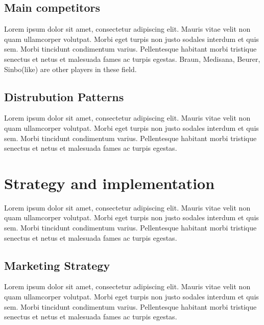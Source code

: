 \documentclass[11pt,a4paper,titlepage]{article}
\begin{document}
\subsection{Main competitors}
Lorem ipsum dolor sit amet, consectetur adipiscing elit. Mauris vitae velit 
non quam ullamcorper volutpat. Morbi eget turpis non justo sodales interdum 
et quis sem. Morbi tincidunt condimentum varius. Pellentesque habitant morbi 
tristique senectus et netus et malesuada fames ac turpis egestas.\newline
Braun, Medisana, Beurer, Sinbo(like) are other players in these field.

\subsection{Distrubution Patterns}
Lorem ipsum dolor sit amet, consectetur adipiscing elit. Mauris vitae velit 
non quam ullamcorper volutpat. Morbi eget turpis non justo sodales interdum 
et quis sem. Morbi tincidunt condimentum varius. Pellentesque habitant morbi 
tristique senectus et netus et malesuada fames ac turpis egestas.\newline
\pagebreak

\section{Strategy and implementation}
Lorem ipsum dolor sit amet, consectetur adipiscing elit. Mauris vitae velit 
non quam ullamcorper volutpat. Morbi eget turpis non justo sodales interdum 
et quis sem. Morbi tincidunt condimentum varius. Pellentesque habitant morbi 
tristique senectus et netus et malesuada fames ac turpis egestas.\newline

\subsection{Marketing Strategy}
Lorem ipsum dolor sit amet, consectetur adipiscing elit. Mauris vitae velit 
non quam ullamcorper volutpat. Morbi eget turpis non justo sodales interdum 
et quis sem. Morbi tincidunt condimentum varius. Pellentesque habitant morbi 
tristique senectus et netus et malesuada fames ac turpis egestas.\newline
\end{document}
